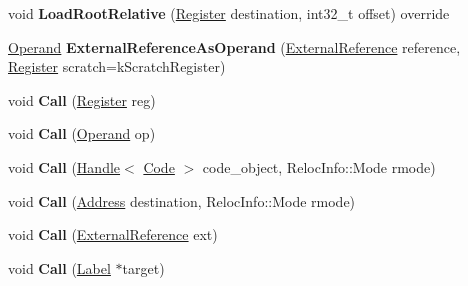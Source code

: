 \begin{DoxyCompactItemize}
void {\bfseries Load\+Root\+Relative} (\mbox{\hyperlink{classv8_1_1internal_1_1Register}{Register}} destination, int32\+\_\+t offset) override
\item 
\mbox{\label{classv8_1_1internal_1_1TurboAssembler_afef71201d23a3bf2dcd307bb0882ddec}} 
\mbox{\hyperlink{classv8_1_1internal_1_1Operand}{Operand}} {\bfseries External\+Reference\+As\+Operand} (\mbox{\hyperlink{classv8_1_1internal_1_1ExternalReference}{External\+Reference}} reference, \mbox{\hyperlink{classv8_1_1internal_1_1Register}{Register}} scratch=k\+Scratch\+Register)
\item 
\mbox{\label{classv8_1_1internal_1_1TurboAssembler_aab49dc4fe6bdb8a14a9c25b4c24e9688}} 
void {\bfseries Call} (\mbox{\hyperlink{classv8_1_1internal_1_1Register}{Register}} reg)
\item 
\mbox{\label{classv8_1_1internal_1_1TurboAssembler_ab4bc301621eb55d8be48d36514703338}} 
void {\bfseries Call} (\mbox{\hyperlink{classv8_1_1internal_1_1Operand}{Operand}} op)
\item 
\mbox{\label{classv8_1_1internal_1_1TurboAssembler_a967d8b97515947ea7d0f87f6c258462f}} 
void {\bfseries Call} (\mbox{\hyperlink{classv8_1_1internal_1_1Handle}{Handle}}$<$ \mbox{\hyperlink{classv8_1_1internal_1_1Code}{Code}} $>$ code\+\_\+object, Reloc\+Info\+::\+Mode rmode)
\item 
\mbox{\label{classv8_1_1internal_1_1TurboAssembler_aced837f595a2dd8ba3bc2e727230ab18}} 
void {\bfseries Call} (\mbox{\hyperlink{classuintptr__t}{Address}} destination, Reloc\+Info\+::\+Mode rmode)
\item 
\mbox{\label{classv8_1_1internal_1_1TurboAssembler_a09155f833e8ac60fd7d2ba1457d1a0a5}} 
void {\bfseries Call} (\mbox{\hyperlink{classv8_1_1internal_1_1ExternalReference}{External\+Reference}} ext)
\item 
\mbox{\label{classv8_1_1internal_1_1TurboAssembler_a76c1a7002369fba1c520446e9e4cfc34}} 
void {\bfseries Call} (\mbox{\hyperlink{classv8_1_1internal_1_1Label}{Label}} $\ast$target)

\end{DoxyCompactItemize}

